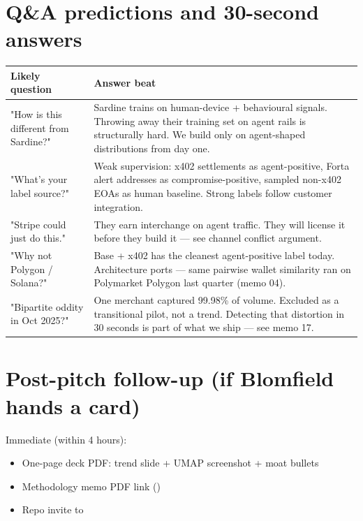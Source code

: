 \documentclass[11pt]{article}
\begin{document}
\section{Q\&A predictions and 30-second answers}
\begin{center}
\begin{tabular}{ll}
\toprule
Likely question & Answer beat \\
\midrule
"How is this different from Sardine?" & Sardine trains on human-device + behavioural signals. Throwing away their training set on agent rails is structurally hard. We build only on agent-shaped distributions from day one. \\
"What's your label source?" & Weak supervision: x402 settlements as agent-positive, Forta alert addresses as compromise-positive, sampled non-x402 EOAs as human baseline. Strong labels follow customer integration. \\
"Stripe could just do this." & They earn interchange on agent traffic. They will license it before they build it --- see channel conflict argument. \\
"Why not Polygon / Solana?" & Base + x402 has the cleanest agent-positive label today. Architecture ports --- same pairwise wallet similarity ran on Polymarket Polygon last quarter (memo 04). \\
"Bipartite oddity in Oct 2025?" & One merchant captured 99.98\% of volume. Excluded as a transitional pilot, not a trend. Detecting that distortion in 30 seconds is part of what we ship --- see memo 17. \\
\bottomrule
\end{tabular}
\end{center}

\section{Post-pitch follow-up (if Blomfield hands a card)}
Immediate (within 4 hours):

\begin{itemize}
  \item One-page deck PDF: trend slide + UMAP screenshot + moat bullets
  \item Methodology memo PDF link ()
  \item Repo invite to 
\end{itemize}
\end{document}
